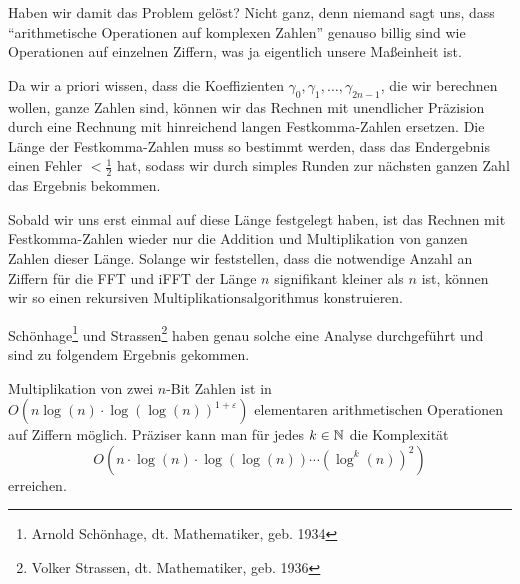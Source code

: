 \begin{remark}
    Haben wir damit das Problem gelöst? Nicht ganz, denn niemand sagt uns, dass \enquote{arithmetische Operationen auf komplexen Zahlen} genauso billig sind wie Operationen auf einzelnen Ziffern, was ja eigentlich unsere Maßeinheit ist.

    \medskip
    Da wir a priori wissen, dass die Koeffizienten $\gamma_0, \gamma_1, \ldots, \gamma_{2n-1}$, die wir berechnen wollen, ganze Zahlen sind, können wir das Rechnen mit unendlicher Präzision durch eine Rechnung mit hinreichend langen Festkomma-Zahlen ersetzen. Die Länge der Festkomma-Zahlen muss so bestimmt werden, dass das Endergebnis einen Fehler $<\frac{1}{2}$ hat, sodass wir durch simples Runden zur nächsten ganzen Zahl das Ergebnis bekommen.

    Sobald wir uns erst einmal auf diese Länge festgelegt haben, ist das Rechnen mit Festkomma-Zahlen wieder nur die Addition und Multiplikation von ganzen Zahlen dieser Länge. Solange wir feststellen, dass die notwendige Anzahl an Ziffern für die FFT und iFFT der Länge $n$ signifikant kleiner als $n$ ist, können wir so einen rekursiven Multiplikationsalgorithmus konstruieren.

    \medskip
    Schönhage\footnote{Arnold Schönhage, dt. Mathematiker, geb. 1934} und Strassen\footnote{Volker Strassen, dt. Mathematiker, geb. 1936} haben genau solche eine Analyse durchgeführt und sind zu folgendem Ergebnis gekommen.
\end{remark}

\begin{theorem}
    Multiplikation von zwei $n$-Bit Zahlen ist in $O(n\log(n)\cdot\log(\log(n))^{1+\varepsilon})$ elementaren arithmetischen Operationen auf Ziffern möglich. Präziser kann man für jedes $k\in\mathbb{N}$ die Komplexität
    \[O(n\cdot \log(n) \cdot \log(\log(n)) \cdots (\log^k(n))^2)\]
    erreichen.
\end{theorem}

